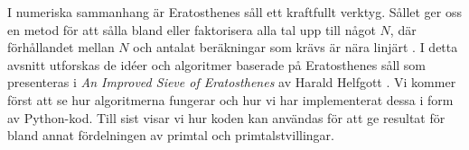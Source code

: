 
I numeriska sammanhang är Eratosthenes såll ett kraftfullt verktyg.
Sållet ger oss en metod för att sålla bland eller faktorisera alla tal upp till något $N$,
där förhållandet mellan $N$ och antalat beräkningar som krävs är nära linjärt \cite[s. 333]{HaraldSieve}.
I detta avsnitt utforskas de idéer och algoritmer baserade på Eratosthenes såll som presenteras i \textit{An Improved Sieve of Eratosthenes} av Harald Helfgott \cite{HaraldSieve}.
Vi kommer först att se hur algoritmerna fungerar och
hur vi har implementerat dessa i form av Python-kod.
Till sist visar vi hur koden kan användas för att ge resultat för bland annat fördelningen av primtal och primtalstvillingar.


